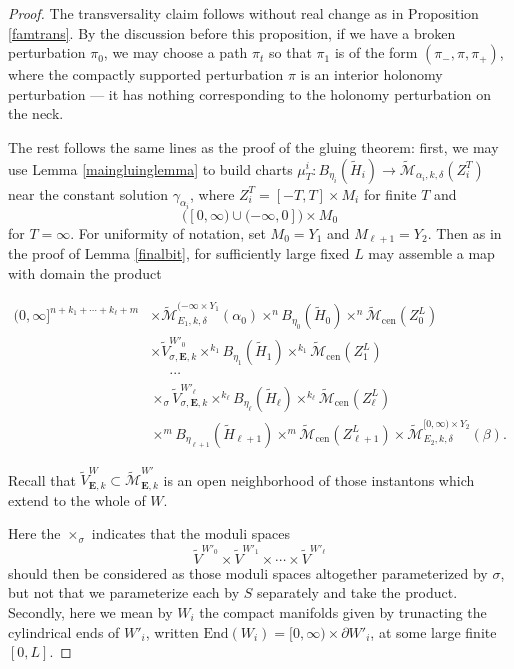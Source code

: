 \documentclass[10pt,a4paper]{amsart}
\theoremstyle{definition}
\theoremstyle{remark}
\numberwithin{figure}{qchap}
\begin{document}
\begin{proof}
The transversality claim follows without real change as in Proposition \ref{famtrans}. By the discussion before this proposition, if we have a broken perturbation $\pi_0$, we may choose a path $\pi_t$ so that $\pi_1$ is of the form $(\pi_-, \pi, \pi_+)$, where the compactly supported perturbation $\pi$ is an interior holonomy perturbation --- it has nothing corresponding to the holonomy perturbation on the neck.

The rest follows the same lines as the proof of the gluing theorem: first, we may use Lemma \ref{maingluinglemma} to build charts $\mu^i_T: B_{\eta_i}(\widetilde H_i) \to \widetilde{\mathcal M}_{\alpha_i, k, \delta}(Z_i^T)$ near the constant solution $\gamma_{\alpha_i}$, where $Z_i^T = [-T, T] \times M_i$ for finite $T$ and $$\big([0, \infty) \cup (-\infty, 0]\big) \times M_0$$ for $T = \infty$. For uniformity of notation, set $M_0 = Y_1$ and $M_{\ell+1} = Y_2$. Then as in the proof of Lemma \ref{finalbit}, for sufficiently large fixed $L$ may assemble a map with domain the product

\begin{align*}(0,\infty]^{n+k_1 + \cdots + k_\ell + m} &\times \widetilde{\mathcal M}^{(-\infty \times Y_1}_{E_1, k, \delta}(\alpha_0) \times^n B_{\eta_0}(\widetilde H_0) \times^n \widetilde{\mathcal M}_{\text{cen}}(Z^L_0)\\
&\times \widetilde{V}^{W'_0}_{\sigma,\mathbf{E},k} \times^{k_1} B_{\eta_1}(\widetilde H_1) \times^{k_1} \widetilde{\mathcal M}_{\text{cen}}(Z^L_1)\\
&\;\;\;\;\;\cdots\\
&\times_\sigma \widetilde{V}^{W'_\ell}_{\sigma,\mathbf{E},k} \times^{k_\ell} B_{\eta_\ell}(\widetilde H_\ell) \times^{k_\ell} \widetilde{\mathcal M}_{\text{cen}}(Z^L_\ell)\\
&\times^m B_{\eta_{\ell+1}}(\widetilde H_{\ell+1}) \times^m \widetilde{\mathcal M}_{\text{cen}}(Z^L_{\ell+1}) \times \widetilde{\mathcal M}^{[0,\infty) \times Y_2}_{E_2,k,\delta}(\beta).
\end{align*}

Recall that $\widetilde{V}^W_{\mathbf{E}, k} \subset \widetilde{\mathcal M}^{W'}_{\mathbf{E}, k}$ is an open neighborhood of those instantons which extend to the whole of $W$.

Here the $\times_\sigma$ indicates that the moduli spaces $$\widetilde{V}^{W'_0} \times \widetilde{V}^{W'_1} \times \cdots \times \widetilde{V}^{W'_\ell}$$ should then be considered as those moduli spaces altogether parameterized by $\sigma$, but not that we parameterize each by $S$ separately and take the product. Secondly, here we mean by $W_i$ the compact manifolds given by trunacting the cylindrical ends of $W'_i$, written $\text{End}(W_i) = [0, \infty) \times \partial W'_i$, at some large finite $[0, L]$.


\end{proof}
\end{document}
